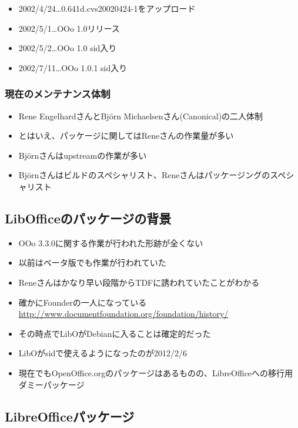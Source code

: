 \documentclass[mingoth,a4paper]{jsarticle}
\begin{document}
\begin{itemize}
\item 2002/4/24…0.641d.cvs20020424-1をアップロード
\item 2002/5/1…OOo 1.0リリース
\item 2002/5/2…OOo 1.0 sid入り
\item 2002/7/11…OOo 1.0.1 sid入り
\end{itemize}

\subsubsection{現在のメンテナンス体制}

\begin{itemize}
\item Rene EngelhardさんとBj\"{o}rn Michaelsenさん(Canonical)の二人体制
\item とはいえ、パッケージに関してはReneさんの作業量が多い
\item Bj\"{o}rnさんはupstreamの作業が多い
\item Bj\"{o}rnさんはビルドのスペシャリスト、Reneさんはパッケージングのスペシャリスト
\end{itemize}

\subsection{LibOfficeのパッケージの背景}

\begin{itemize}
\item OOo 3.3.0に関する作業が行われた形跡が全くない
\item 以前はベータ版でも作業が行われていた
\item Reneさんはかなり早い段階からTDFに誘われていたことがわかる
\item 確かにFounderの一人になっている\\
\url{http://www.documentfoundation.org/foundation/history/}
\item その時点でLibOがDebianに入ることは確定的だった
\item LibOがsidで使えるようになったのが2012/2/6
\item 現在でもOpenOffice.orgのパッケージはあるものの、LibreOfficeへの移行用ダミーパッケージ
\end{itemize}

\subsection{LibreOfficeパッケージ}
\end{document}
